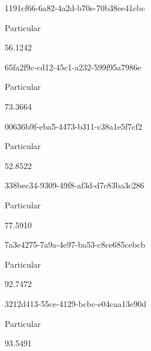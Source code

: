 \documentclass[
  11pt,
  a4paper,
  DIV=11,
  numbers=noendperiod]{scrartcl}
\begin{document}
\n      

1191cf66-6a82-4a2d-b70e-70b38ee41cbc

\n      

Particular

\n      

56.1242

\n    

\n    

\n      

65fa2f9c-cd12-45c1-a232-599f95a7986e

\n      

Particular

\n      

73.3664

\n    

\n    

\n      

00636b9f-eba5-4473-b311-c38a1e5f7cf2

\n      

Particular

\n      

52.8522

\n    

\n    

\n      

338bec34-9309-49f8-af3d-d7c83ba3c286

\n      

Particular

\n      

77.5910

\n    

\n    

\n      

7a3e4275-7a9a-4e97-ba53-c8ce685cebcb

\n      

Particular

\n      

92.7472

\n    

\n    

\n      

3212d413-55ce-4129-bcbc-e04caa13e90d

\n      

Particular

\n      

93.5491

\n    

\n    

\n      
\end{document}
